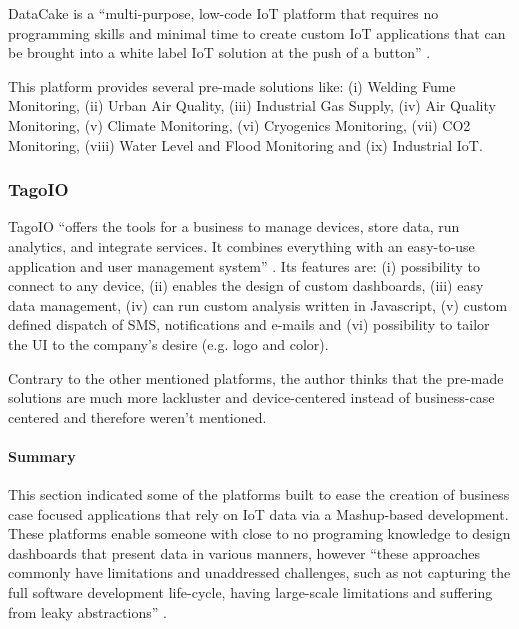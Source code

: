 DataCake is a ``multi-purpose, low-code \gls{IoT} platform that requires no programming skills and minimal time to create custom \gls{IoT} applications that can be brought into a white label \gls{IoT} solution at the push of a button'' \parencite{datacake}.

This platform provides several pre-made solutions like: (i) Welding Fume Monitoring, (ii) Urban Air Quality, (iii) Industrial Gas Supply, (iv) Air Quality Monitoring, (v) Climate Monitoring, (vi) Cryogenics Monitoring, (vii) CO2 Monitoring, (viii) Water Level and Flood Monitoring and (ix) Industrial \gls{IoT}.

\subsubsection{TagoIO}
\label{subsubsec:stateofart:arch:platforms:tagoio}

TagoIO ``offers the tools for a business to manage devices, store data, run analytics, and integrate services. It combines everything with an easy-to-use application and user management system'' \parencite{tagoio}. Its features are: (i) possibility to connect to any device, (ii) enables the design of custom dashboards, (iii) easy data management, (iv) can run custom analysis written in Javascript, (v) custom defined dispatch of SMS, notifications and e-mails and (vi) possibility to tailor the \gls{UI} to the company's desire (e.g. logo and color). 

Contrary to the other mentioned platforms, the author thinks that the pre-made solutions are much more lackluster and device-centered instead of business-case centered and therefore weren't mentioned.

\paragraph{Summary}
\label{subsubsec:stateofart:arch:platforms:summary}

This section indicated some of the platforms built to ease the creation of business case focused applications that rely on \gls{IoT} data via a Mashup-based development.
These platforms enable someone with close to no programing knowledge to design dashboards that present data in various manners, however ``these approaches commonly have limitations and unaddressed challenges, such as not capturing the full software development life-cycle, having large-scale limitations and suffering from leaky abstractions'' \parencite{DIAS2022100529}.

